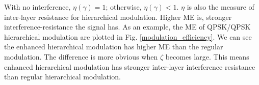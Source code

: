 \documentclass[conference]{IEEEtran}
\begin{document}
\noindent With no interference, $\eta\left(\gamma\right)=1$;
otherwise, $\eta\left(\gamma\right)<1$. $\eta$ is also the measure
of inter-layer resistance for hierarchical modulation. Higher ME
is, stronger interference-resistance the signal has. As an
example, the ME of QPSK/QPSK hierarchical modulation are plotted
in Fig. \ref{modulation_efficiency}. We can see the enhanced
hierarchical modulation has higher ME than the regular modulation.
The difference is more obvious when $\zeta$ becomes large. This
means enhanced hierarchical modulation has stronger inter-layer
interference resistance than regular hierarchical modulation.
\begin{figure}
\end{figure}
\end{document}
